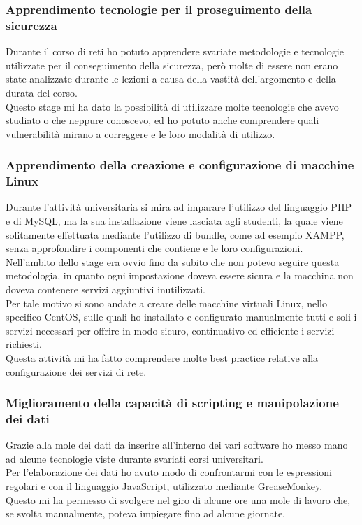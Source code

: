 \documentclass[Tesi.tex]{subfiles}
\begin{document}
\subsubsection{Apprendimento tecnologie per il proseguimento della sicurezza}
Durante il corso di reti ho potuto apprendere svariate metodologie e tecnologie utilizzate per il conseguimento della sicurezza, però molte di essere non erano state analizzate durante le lezioni a causa della vastità dell'argomento e della durata del corso. \\
Questo stage mi ha dato la possibilità di utilizzare molte tecnologie che avevo studiato o che neppure conoscevo, ed ho potuto anche comprendere quali vulnerabilità mirano a correggere e le loro modalità di utilizzo.

\subsubsection{Apprendimento della creazione e configurazione di macchine Linux}
Durante l'attività universitaria si mira ad imparare l'utilizzo del linguaggio PHP e di MySQL, ma la sua installazione viene lasciata agli studenti, la quale viene solitamente effettuata mediante l'utilizzo di bundle, come ad esempio XAMPP, senza approfondire i componenti che contiene e le loro configurazioni. \\
Nell'ambito dello stage era ovvio fino da subito che non potevo seguire questa metodologia, in quanto ogni impostazione doveva essere sicura e la macchina non doveva contenere servizi aggiuntivi inutilizzati. \\
Per tale motivo si sono andate a creare delle macchine virtuali Linux, nello specifico CentOS, sulle quali ho installato e configurato manualmente tutti e soli i servizi necessari per offrire in modo sicuro, continuativo ed efficiente i servizi richiesti. \\
Questa attività mi ha fatto comprendere molte best practice relative alla configurazione dei servizi di rete.

\subsubsection{Miglioramento della capacità di scripting e manipolazione dei dati}
Grazie alla mole dei dati da inserire all'interno dei vari software ho messo mano ad alcune tecnologie viste durante svariati corsi universitari. \\
Per l'elaborazione dei dati ho avuto modo di confrontarmi con le espressioni regolari e con il linguaggio JavaScript, utilizzato mediante GreaseMonkey. \\
Questo mi ha permesso di svolgere nel giro di alcune ore una mole di lavoro che, se svolta manualmente, poteva impiegare fino ad alcune giornate.
\end{document}
